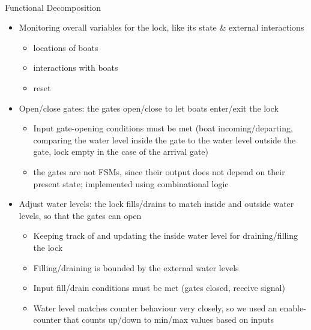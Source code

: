 \documentclass{article}
\begin{document}
      \paragraph{} Functional Decomposition
      \begin{itemize}
        \item Monitoring overall variables for the lock, like its state \& external interactions
        \begin{itemize}
          \item locations of boats
          \item interactions with boats
          \item reset
        \end{itemize}

        \item Open/close gates: the gates open/close to let boats enter/exit the lock
        \begin{itemize}
          \item Input gate-opening conditions must be met (boat incoming/departing, comparing the water level inside the gate to the water level outside the gate, lock empty in the case of the arrival gate)
          \item the gates are not FSMs, since their output does not depend on their present state; implemented using combinational logic
        \end{itemize}

        \item Adjust water levels: the lock fills/drains to match inside and outside water levels, so that the gates can open
        \begin{itemize}
          \item Keeping track of and updating the inside water level for draining/filling the lock
          \item Filling/draining is bounded by the external water levels
          \item Input fill/drain conditions must be met (gates closed, receive signal)
          \item Water level matches counter behaviour very closely, so we used an enable-counter that counts up/down to min/max values based on inputs
        \end{itemize}
      \end{itemize}
\end{document}
